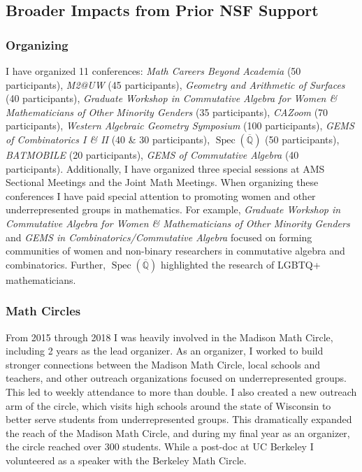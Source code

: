 \documentclass[11pt,reqno]{amsart}
\theoremstyle{remark}
\newcommand{\Spec}{\operatorname{Spec}}
\newcommand{\QQ}{\mathbb{Q}}
\begin{document}
\subsection{Broader Impacts from Prior NSF Support}

\subsubsection{Organizing}\label{subsubsec:prior-organizing} I have organized 11 conferences: \textit{Math Careers Beyond Academia } (50 participants), \textit{M2@UW} (45 participants), \textit{Geometry and Arithmetic of Surfaces} (40 participants), \textit{Graduate Workshop in Commutative Algebra for Women \& Mathematicians of Other Minority Genders} (35 participants), \textit{CAZoom} (70 participants), \textit{Western Algebraic Geometry Symposium} (100 participants), \textit{GEMS of Combinatorics I \& II} (40 \& 30 participants), $\Spec(\overline{\QQ})$ (50 participants), \textit{BATMOBILE} (20 participants),  \textit{GEMS of Commutative Algebra} (40 participants). Additionally, I have organized three special sessions at AMS Sectional Meetings and the Joint Math Meetings. When organizing these conferences I have paid special attention to promoting women and other underrepresented groups in mathematics. For example, \textit{Graduate Workshop in Commutative Algebra for Women \& Mathematicians of Other Minority Genders} and \textit{GEMS in Combinatorics/Commutative Algebra}  focused on forming communities of women and non-binary researchers in commutative algebra and combinatorics. Further, $\Spec(\overline{\QQ})$ highlighted the research of LGBTQ+ mathematicians.


\subsubsection{Math Circles}
	From 2015 through 2018 I was heavily involved in the Madison Math Circle, including  2 years as the lead organizer. As an organizer, I worked to build stronger connections between the Madison Math Circle, local schools and teachers, and other outreach organizations focused on underrepresented groups. This led to weekly attendance to more than double. I also created a new outreach arm of the circle, which visits high schools around the state of Wisconsin to better serve students from underrepresented groups. This dramatically expanded the reach of the Madison Math Circle, and during my final year as an organizer, the circle reached over 300 students. While a post-doc at UC Berkeley I volunteered as a speaker with the Berkeley Math Circle. 
\end{document}
